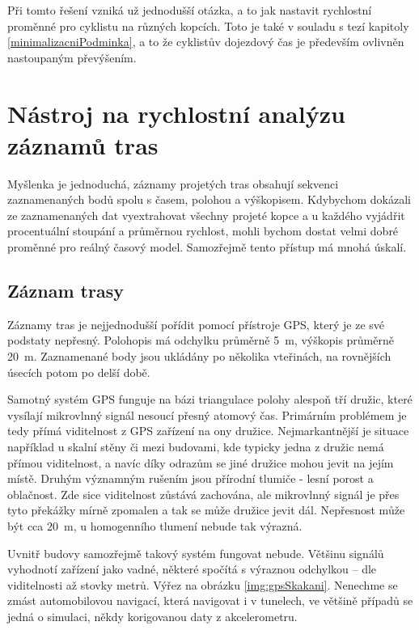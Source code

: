 \documentclass[thesis=B,czech]{FITthesis}[2012/06/26]
\begin{document}
Při tomto řešení vzniká už jednodušší otázka, a to jak nastavit rychlostní proměnné pro cyklistu na různých kopcích. Toto je také v souladu s tezí kapitoly \ref{minimalizacniPodminka}, a to že cyklistův dojezdový čas je především ovlivněn nastoupaným převýšením.

\section{Nástroj na rychlostní analýzu záznamů tras}
Myšlenka je jednoduchá, záznamy projetých tras obsahují sekvenci zaznamenaných bodů spolu s časem, polohou a výškopisem. Kdybychom dokázali ze zaznamenaných dat vyextrahovat všechny projeté kopce a u každého vyjádřit procentuální stoupání a průměrnou rychlost, mohli bychom dostat velmi dobré proměnné pro reálný časový model. Samozřejmě tento přístup má mnohá úskalí. 

\subsection{Záznam trasy}
\label{zaznamTrasy}
Záznamy tras je nejjednodušší pořídit pomocí přístroje GPS, který je ze své podstaty nepřesný. Polohopis má odchylku průměrně 5~m, výškopis průměrně 20~m. Zaznamenané body jsou ukládány po několika vteřinách, na rovnějších úsecích potom po delší době. 

Samotný systém GPS funguje na bázi triangulace polohy alespoň tří družic, které vysílají mikrovlnný signál nesoucí přesný atomový čas. Primárním problémem je tedy přímá viditelnost z GPS zařízení na ony družice. Nejmarkantnější je situace například u skalní stěny či mezi budovami, kde typicky jedna z družic nemá přímou viditelnost, a navíc díky odrazům se jiné družice mohou jevit na jejím místě. Druhým významným rušením jsou přírodní tlumiče - lesní porost a oblačnost. Zde sice viditelnost zůstává zachována, ale mikrovlnný signál je přes tyto překážky mírně zpomalen a tak se může družice jevit dál. Nepřesnost může být cca 20~m, u homogenního tlumení nebude tak výrazná.

Uvnitř budovy samozřejmě takový systém fungovat nebude. Většinu signálů vyhodnotí zařízení jako vadné, některé spočítá s výraznou odchylkou -- dle viditelnosti až stovky metrů. Výřez na obrázku \ref{img:gpsSkakani}. Nenechme se zmást automobilovou navigací, která  navigovat i v tunelech, ve většině případů se jedná o simulaci, někdy korigovanou daty z akcelerometru.
\end{document}
